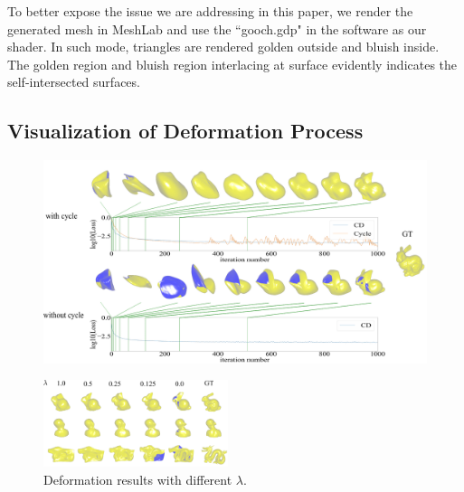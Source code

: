 To better expose the issue we are addressing in this paper, we render the generated mesh in MeshLab and use the ``gooch.gdp" in the software as our shader. In such mode, triangles are rendered golden outside and bluish inside. The golden region and bluish region interlacing at surface evidently indicates the self-intersected surfaces.

\subsection{Visualization of Deformation Process}
\label{subsec:deform}
\begin{figure}
	\centering
	\includegraphics[width=\linewidth]{img/opt/opt2}
	\caption{}
	\label{fig:opt}
\end{figure}
\begin{figure}
	\begin{center}
		\includegraphics[width=0.48\textwidth]{img/opt/lambda}
	\end{center}
	\caption{Deformation results with different $\lambda$.}
	\label{fig:lambda}
\end{figure}
